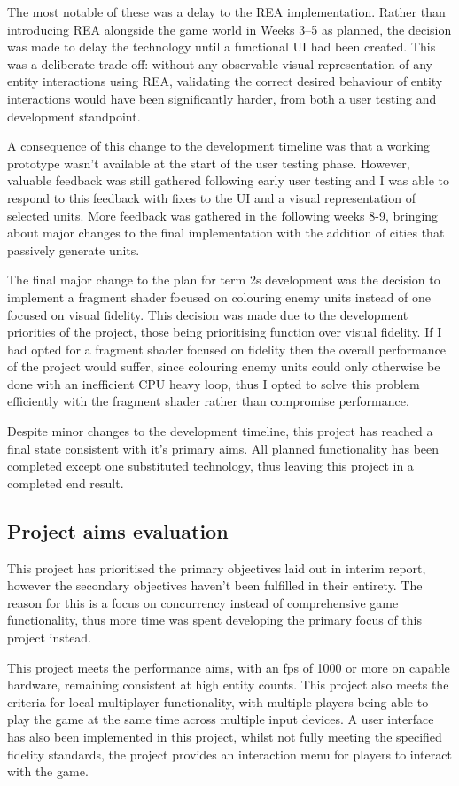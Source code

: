 \documentclass[]{final_report}
\begin{document}
The most notable of these was a delay to the REA implementation. Rather than introducing REA alongside the game world in Weeks 3–5 as planned, the decision was made to delay the technology until a functional UI had been created. This was a deliberate trade-off: without any observable visual representation of any entity interactions using REA, validating the correct desired behaviour of entity interactions would have been significantly harder, from both a user testing and development standpoint.

A consequence of this change to the development timeline was that a working prototype wasn't available at the start of the user testing phase. However, valuable feedback was still gathered following early user testing and I was able to respond to this feedback with fixes to the UI and a visual representation of selected units. More feedback was gathered in the following weeks 8-9, bringing about major changes to the final implementation with the addition of cities that passively generate units.

The final major change to the plan for term 2s development was the decision to implement a fragment shader focused on colouring enemy units instead of one focused on visual fidelity. This decision was made due to the development priorities of the project, those being prioritising function over visual fidelity. If I had opted for a fragment shader focused on fidelity then the overall performance of the project would suffer, since colouring enemy units could only otherwise be done with an inefficient CPU heavy loop, thus I opted to solve this problem efficiently with the fragment shader rather than compromise performance.

Despite minor changes to the development timeline, this project has reached a final state consistent with it's primary aims. All planned functionality has been completed except one substituted technology, thus leaving this project in a completed end result.
\subsection{Project aims evaluation}
This project has prioritised the primary objectives laid out in interim report, however the secondary objectives haven't been fulfilled in their entirety. The reason for this is a focus on concurrency instead of comprehensive game functionality, thus more time was spent developing the primary focus of this project instead.

This project meets the performance aims, with an fps of 1000 or more on capable hardware, remaining consistent at high entity counts. This project also meets the criteria for local multiplayer functionality, with multiple players being able to play the game at the same time across multiple input devices. A user interface has also been implemented in this project, whilst not fully meeting the specified fidelity standards, the project provides an interaction menu for players to interact with the game.
\end{document}
